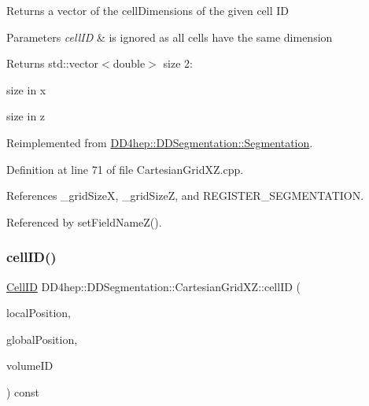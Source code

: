 Returns a vector of the cell\+Dimensions of the given cell ID 
\begin{DoxyParams}{Parameters}
{\em cell\+ID} & is ignored as all cells have the same dimension \\
\hline
\end{DoxyParams}
\begin{DoxyReturn}{Returns}
std\+::vector$<$double$>$ size 2\+:
\begin{DoxyEnumerate}
\item size in x
\item size in z 
\end{DoxyEnumerate}
\end{DoxyReturn}


Reimplemented from \hyperlink{class_d_d4hep_1_1_d_d_segmentation_1_1_segmentation_ac2119ba64c9805751e08b6100ef6fee6}{D\+D4hep\+::\+D\+D\+Segmentation\+::\+Segmentation}.



Definition at line 71 of file Cartesian\+Grid\+X\+Z.\+cpp.



References \+\_\+grid\+SizeX, \+\_\+grid\+SizeZ, and R\+E\+G\+I\+S\+T\+E\+R\+\_\+\+S\+E\+G\+M\+E\+N\+T\+A\+T\+I\+ON.



Referenced by set\+Field\+Name\+Z().

\hypertarget{class_d_d4hep_1_1_d_d_segmentation_1_1_cartesian_grid_x_z_a78be61402af91066cf8e5048ed5441c5}{}\label{class_d_d4hep_1_1_d_d_segmentation_1_1_cartesian_grid_x_z_a78be61402af91066cf8e5048ed5441c5} 
\subsubsection{\texorpdfstring{cell\+I\+D()}{cellID()}}
{\footnotesize\ttfamily \hyperlink{namespace_d_d4hep_1_1_d_d_segmentation_ac7af071d85cb48820914434a07e21ba1}{Cell\+ID} D\+D4hep\+::\+D\+D\+Segmentation\+::\+Cartesian\+Grid\+X\+Z\+::cell\+ID (\begin{DoxyParamCaption}\item[{const \hyperlink{struct_d_d4hep_1_1_d_d_segmentation_1_1_vector3_d}{Vector3D} \&}]{local\+Position,  }\item[{const \hyperlink{struct_d_d4hep_1_1_d_d_segmentation_1_1_vector3_d}{Vector3D} \&}]{global\+Position,  }\item[{const \hyperlink{namespace_d_d4hep_1_1_d_d_segmentation_a61a6833a18d1800bdef176595f83e3ba}{Volume\+ID} \&}]{volume\+ID }\end{DoxyParamCaption}) const\hspace{0.3cm}{\ttfamily [virtual]}}



